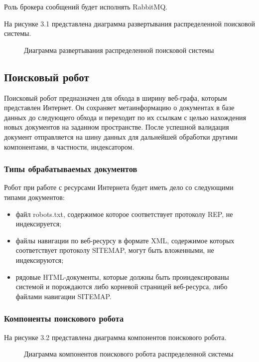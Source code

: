 Роль брокера сообщений будет исполнять RabbitMQ.

На рисунке 3.1 представлена диаграмма развертывания распределенной поисковой системы.

\begin{figure}[H]
\caption{Диаграмма развертывания распределенной поисковой системы}
\label{diagram_deployment:image}
\end{figure}

\subsection{Поисковый робот}

Поисковый робот предназначен для обхода в ширину веб-графа, которым представлен Интернет. Он сохраняет метаинформацию о документах в базе данных до следующего обхода и переходит по их ссылкам с целью нахождения новых документов на заданном пространстве. После успешной валидация документ отправляется на шину данных для дальнейшей обработки другими компонентами, в частности, индексатором. 

\subsubsection{Типы обрабатываемых документов}
Робот при работе с ресурсами Интернета будет иметь дело со следующими типами документов:
\begin{itemize}
\item файл robots.txt, содержимое которое соответствует протоколу REP, не индексируется;
\item файлы навигации по веб-ресурсу в формате XML, содержимое которых соответствует протоколу SITEMAP, могут быть вложенными, не индексируются;
\item рядовые HTML-документы, которые должны быть проиндексированы системой и порождаются либо корневой страницей веб-ресурса, либо файлами навигации SITEMAP.
\end{itemize}

\subsubsection{Компоненты поискового робота}

На рисунке 3.2 представлена диаграмма компонентов поискового робота.

\begin{figure}[H]
\caption{Диаграмма компонентов поискового робота распределенной системы}
\label{robot/diagram_components:image}
\end{figure}

